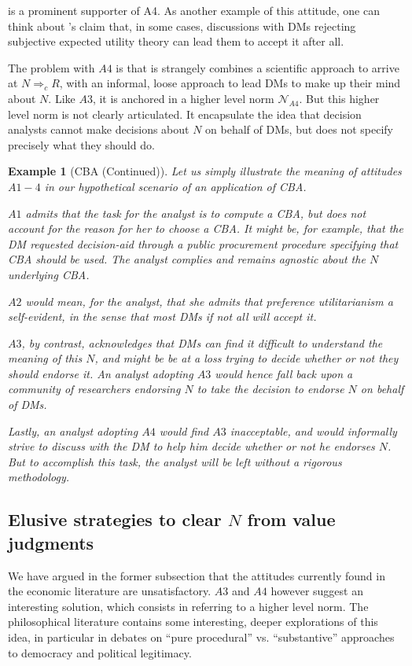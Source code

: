 \documentclass[preprint, french, english, 11pt, authoryear]{elsarticle}%
\newcommand{\protectforpdf}[1]{\texorpdfstring{\ensuremath{#1}}{#1}}
\newtheorem{example}{Example}
\begin{document}
\citet{roy_multicriteria_1996} is a prominent supporter of A4. As another example of this attitude, one can think about \citet{raiffa_back_1985}’s claim that, in some cases, discussions with \acp{DM} rejecting subjective expected utility theory can lead them to accept it after all.

The problem with $A4$ is that is strangely combines a scientific approach to arrive at $N ⇒_c R$, with an informal, loose approach to lead \acp{DM} to make up their mind about $N$. Like $A3$, it is anchored in a higher level norm $\mathscr{N}_{A4}$. But this higher level norm is not clearly articulated. It encapsulate the idea that decision analysts cannot make decisions about $N$ on behalf of \acp{DM}, but does not specify precisely what they should do.

\begin{example}[CBA (Continued)]
Let us simply illustrate the meaning of attitudes $A1-4$ in our hypothetical scenario of an application of CBA.

$A1$ admits that the task for the analyst is to compute a CBA, but does not account for the reason for her to choose a CBA. It might be, for example, that the \ac{DM} requested decision-aid through a public procurement procedure specifying that CBA should be used. The analyst complies and remains agnostic about the $N$ underlying CBA.

$A2$ would mean, for the analyst, that she admits that preference utilitarianism a self-evident, in the sense that most \acp{DM} if not all will accept it.

$A3$, by contrast, acknowledges that \acp{DM} can find it difficult to understand the meaning of this $N$, and might be be at a loss trying to decide whether or not they should endorse it. An analyst adopting $A3$ would hence fall back upon a community of researchers endorsing $N$ to take the decision to endorse $N$ on behalf of \acp{DM}.

Lastly, an analyst adopting $A4$ would find $A3$ inacceptable, and would informally strive to discuss with the \ac{DM} to help him decide whether or not he endorses $N$. But to accomplish this task, the analyst will be left without a rigorous methodology.
\end{example}


\subsection{Elusive strategies to clear \protectforpdf{N} from value judgments}
We have argued in the former subsection that the attitudes currently found in the economic literature are unsatisfactory. $A3$ and $A4$ however suggest an interesting solution, which consists in referring to a higher level norm. The philosophical literature contains some interesting, deeper explorations of this idea, in particular in debates on “pure procedural” vs. “substantive” approaches to democracy and political legitimacy.
\end{document}
